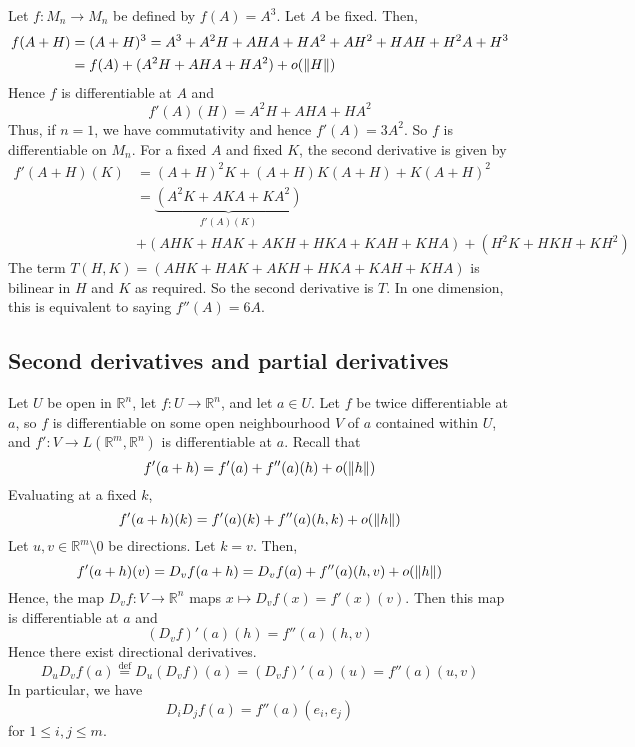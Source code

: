 \begin{example}
	Let \( f \colon M_n \to M_n \) be defined by \( f(A) = A^3 \).
	Let \( A \) be fixed.
	Then,
	\begin{align*}
		f(A+H) & = (A+H)^3 = A^3 + A^2 H + AHA + H A^2 + A H^2 + HAH + H^2 A + H^3 \\
		       & = f(A) + (A^2 H + AHA + H A^2) + o\qty(\norm{H})
	\end{align*}
	Hence \( f \) is differentiable at \( A \) and
	\[
		f'(A)(H) = A^2 H + AHA + H A^2
	\]
	Thus, if \( n = 1 \), we have commutativity and hence \( f'(A) = 3A^2 \).
	So \( f \) is differentiable on \( M_n \).
	For a fixed \( A \) and fixed \( K \), the second derivative is given by
	\begin{align*}
		f'(A+H)(K) & = (A+H)^2 K + (A+H)K(A+H) + K (A+H)^2                        \\
		           & = \underbrace{(A^2 K + AKA + K A^2)}_{f'(A)(K)}              \\
		           & + (AHK + HAK + AKH + HKA + KAH + KHA) + (H^2 K + HKH + KH^2)
	\end{align*}
	The term \( T(H,K) = (AHK + HAK + AKH + HKA + KAH + KHA) \) is bilinear in \( H \) and \( K \) as required.
	So the second derivative is \( T \).
	In one dimension, this is equivalent to saying \( f''(A) = 6A \).
\end{example}

\subsection{Second derivatives and partial derivatives}
Let \( U \) be open in \( \mathbb R^n \), let \( f \colon U \to \mathbb R^n \), and let \( a \in U \).
Let \( f \) be twice differentiable at \( a \), so \( f \) is differentiable on some open neighbourhood \( V \) of \( a \) contained within \( U \), and \( f' \colon V \to L(\mathbb R^m, \mathbb R^n) \) is differentiable at \( a \).
Recall that
\[
	f'(a+h) = f'(a) + f''(a)(h) + o\qty(\norm{h})
\]
Evaluating at a fixed \( k \),
\[
	f'(a+h)(k) = f'(a)(k) + f''(a)(h,k) + o\qty(\norm{h})
\]
Let \( u, v \in \mathbb R^m \setminus \qty{0} \) be directions.
Let \( k = v \).
Then,
\[
	f'(a+h)(v) = D_v f(a+h) = D_v f(a) + f''(a)(h,v) + o\qty(\norm{h})
\]
Hence, the map \( D_v f \colon V \to \mathbb R^n \) maps \( x \mapsto D_v f(x) = f'(x)(v) \).
Then this map is differentiable at \( a \) and
\[
	(D_v f)'(a)(h) = f''(a)(h,v)
\]
Hence there exist directional derivatives.
\[
	D_u D_v f(a) \overset{\mathrm{def}}{=} D_u (D_v f)(a) = (D_v f)'(a)(u) = f''(a)(u,v)
\]
In particular, we have
\[
	D_i D_j f(a) = f''(a)(e_i, e_j)
\]
for \( 1 \leq i, j \leq m \).

